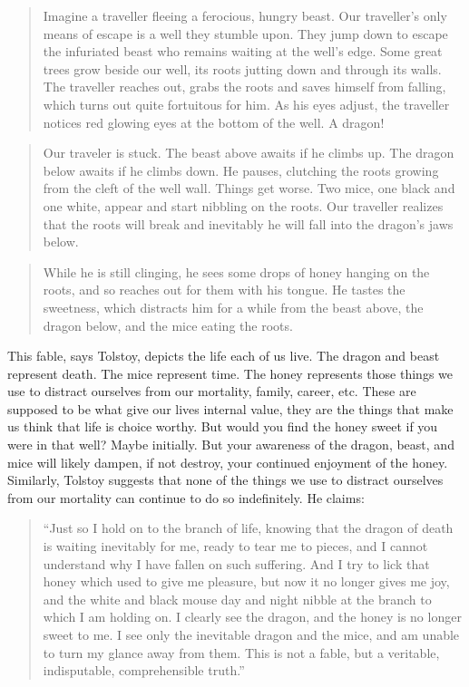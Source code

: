 \documentclass[]{article}
\begin{document}
\begin{quote}
Imagine a traveller fleeing a ferocious, hungry beast. Our traveller's
only means of escape is a well they stumble upon. They jump down to
escape the infuriated beast who remains waiting at the well's edge. Some
great trees grow beside our well, its roots jutting down and through its
walls. The traveller reaches out, grabs the roots and saves himself from
falling, which turns out quite fortuitous for him. As his eyes adjust,
the traveller notices red glowing eyes at the bottom of the well. A
dragon!
\end{quote}

\begin{quote}
Our traveler is stuck. The beast above awaits if he climbs up. The
dragon below awaits if he climbs down. He pauses, clutching the roots
growing from the cleft of the well wall. Things get worse. Two mice, one
black and one white, appear and start nibbling on the roots. Our
traveller realizes that the roots will break and inevitably he will fall
into the dragon's jaws below.
\end{quote}

\begin{quote}
While he is still clinging, he sees some drops of honey hanging on the
roots, and so reaches out for them with his tongue. He tastes the
sweetness, which distracts him for a while from the beast above, the
dragon below, and the mice eating the roots.
\end{quote}

This fable, says Tolstoy, depicts the life each of us live. The dragon
and beast represent death. The mice represent time. The honey represents
those things we use to distract ourselves from our mortality, family,
career, etc. These are supposed to be what give our lives internal
value, they are the things that make us think that life is choice
worthy. But would you find the honey sweet if you were in that well?
Maybe initially. But your awareness of the dragon, beast, and mice will
likely dampen, if not destroy, your continued enjoyment of the honey.
Similarly, Tolstoy suggests that none of the things we use to distract
ourselves from our mortality can continue to do so indefinitely. He
claims:

\begin{quote}
``Just so I hold on to the branch of life, knowing that the dragon of
death is waiting inevitably for me, ready to tear me to pieces, and I
cannot understand why I have fallen on such suffering. And I try to lick
that honey which used to give me pleasure, but now it no longer gives me
joy, and the white and black mouse day and night nibble at the branch to
which I am holding on. I clearly see the dragon, and the honey is no
longer sweet to me. I see only the inevitable dragon and the mice, and
am unable to turn my glance away from them. This is not a fable, but a
veritable, indisputable, comprehensible truth.''
\end{quote}
\end{document}
